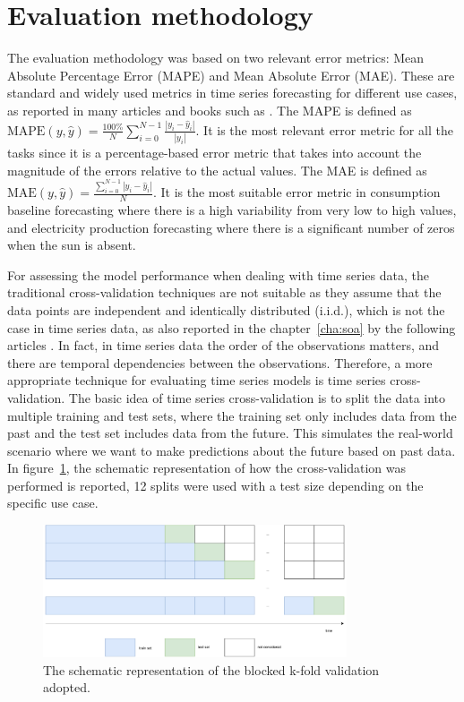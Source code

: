 \section{Evaluation methodology}
\label{sec:methodology}
\vspace{0.2 cm}

The evaluation methodology was based on two relevant error metrics: Mean Absolute Percentage Error (MAPE) and Mean Absolute Error (MAE).
These are standard and widely used metrics in time series forecasting for different use cases, as reported in many articles and books such as \cite{armstrong2001principles, DEGOOIJER2006443, HYNDMAN2006679}.
The MAPE is defined as $\text{MAPE}(y, \hat{y}) = \frac{100\%}{N} \sum_{i=0}^{N - 1} \frac{|y_i - \hat{y}_i|}{|y_i|}$.
It is the most relevant error metric for all the tasks since it is a percentage-based error metric that takes into account the magnitude of the errors relative to the actual values.
The MAE is defined as $\text{MAE}(y, \hat{y}) = \frac{ \sum_{i=0}^{N - 1} |y_i - \hat{y}_i| }{N}$.
It is the most suitable error metric in consumption baseline forecasting where there is a high variability from very low to high values, and electricity production forecasting where there is a significant number of zeros when the sun is absent.

For assessing the model performance when dealing with time series data, the traditional cross-validation techniques are not suitable as they assume that the data points are independent and identically distributed (i.i.d.), which is not the case in time series data, as also reported in the chapter~\ref{cha:soa} by the following articles \cite{BERGMEIR2012192, Cerqueira2020}.
In fact, in time series data the order of the observations matters, and there are temporal dependencies between the observations.
Therefore, a more appropriate technique for evaluating time series models is time series cross-validation.
The basic idea of time series cross-validation is to split the data into multiple training and test sets, where the training set only includes data from the past and the test set includes data from the future.
This simulates the real-world scenario where we want to make predictions about the future based on past data.
In figure~\ref{fig:crossvalidation}, the schematic representation of how the cross-validation was performed is reported, 12 splits were used with a test size depending on the specific use case.

\begin{figure}[H]
\centering
\includegraphics[width=0.8\textwidth]{images/cross_validation}
\caption{The schematic representation of the blocked k-fold validation adopted.}
\label{fig:crossvalidation}
\end{figure}

